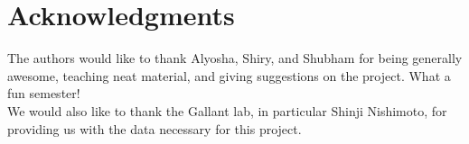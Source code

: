 \documentclass[journal]{IEEEtran}
\begin{document}
%





\section*{Acknowledgments}
The authors would like to thank Alyosha, Shiry, and Shubham for being generally awesome, teaching neat material, and giving suggestions on the project.  What a fun semester!\\
We would also like to thank the Gallant lab, in particular Shinji Nishimoto, for providing us with the data necessary for this project.


\ifCLASSOPTIONcaptionsoff
  \newpage
\fi



\end{document}
